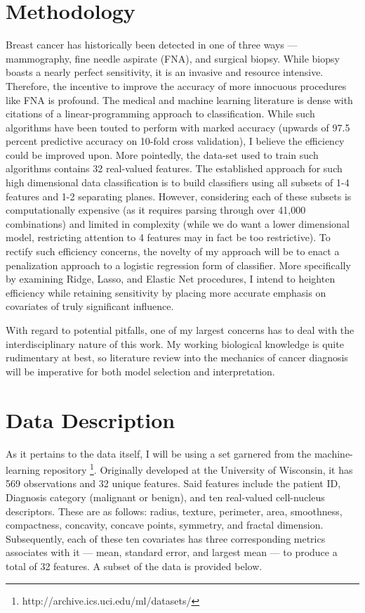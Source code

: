 \documentclass[10pt]{article}
\begin{document}
\section{Methodology}

	Breast cancer has historically been detected in one of three ways — mammography, fine needle aspirate (FNA), and surgical biopsy.  While biopsy boasts a nearly perfect sensitivity, it is an invasive and resource intensive.  Therefore, the incentive to improve the accuracy of more innocuous procedures like FNA is profound.  The medical and machine learning literature is dense with citations of a linear-programming approach to classification.  While such algorithms have been touted to perform with marked accuracy (upwards of 97.5 percent predictive accuracy on 10-fold cross validation), I believe the efficiency could be improved upon.  More pointedly, the data-set used to train such algorithms contains 32 real-valued features.  The established approach for such high dimensional data classification is to build classifiers using all subsets of 1-4 features and 1-2 separating planes.  However, considering each of these subsets is computationally expensive (as it requires parsing through over 41,000 combinations) and limited in complexity (while we do want a lower dimensional model, restricting attention to 4 features may in fact be too restrictive).  To rectify such efficiency concerns, the novelty of my approach will be to enact a penalization approach to a logistic regression form of classifier.  More specifically by examining Ridge, Lasso, and Elastic Net procedures, I intend to heighten efficiency while retaining sensitivity by placing more accurate emphasis on covariates of truly significant influence.  
	
	With regard to potential pitfalls, one of my largest concerns has to deal with the interdisciplinary nature of this work.  My working biological knowledge is quite rudimentary at best, so literature review into the mechanics of cancer diagnosis will be imperative for both model selection and interpretation.  
	
	

\section{Data Description}	

	As it pertains to the data itself, I will be using a set garnered from the machine-learning repository \footnote{http://archive.ics.uci.edu/ml/datasets/}.  Originally developed at the University of Wisconsin, it has 569 observations and 32 unique features.  Said features include the patient ID, Diagnosis category (malignant or benign), and ten real-valued cell-nucleus descriptors.  These are as follows: radius, texture, perimeter, area, smoothness, compactness, concavity, concave points, symmetry, and fractal dimension.  Subsequently, each of these ten covariates has three corresponding metrics associates with it — mean, standard error, and largest mean — to produce a total of 32 features.  A subset of the data is provided below.  
		
\end{document}
